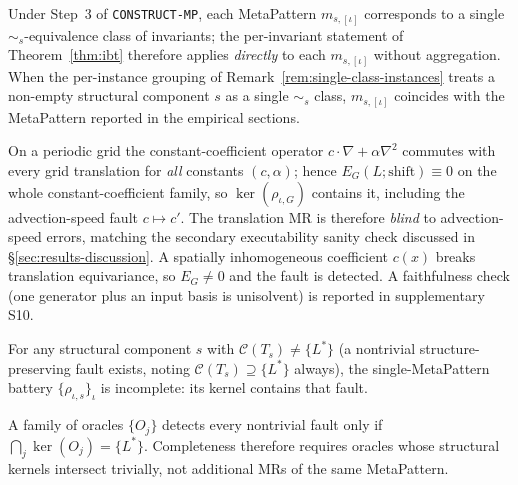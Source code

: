 \begin{remark}
\label{rem:ibt-mp}
Under Step~3 of \texttt{CONSTRUCT-MP}, each MetaPattern $m_{s,[\iota]}$ corresponds
to a single $\sim_s$-equivalence class of invariants; the per-invariant statement
of Theorem~\ref{thm:ibt} therefore applies \emph{directly} to each $m_{s,[\iota]}$
without aggregation. When the per-instance grouping of
Remark~\ref{rem:single-class-instances} treats a non-empty structural component $s$ as a single
$\sim_s$ class, $m_{s,[\iota]}$ coincides with the MetaPattern reported
in the empirical sections.
\end{remark}

\begin{remark}
\label{rem:ibt-advdiff}
On a periodic grid the constant-coefficient operator $c\cdot\nabla+\alpha\nabla^2$
commutes with every grid translation for \emph{all} constants $(c,\alpha)$; hence
$E_G(L;\text{shift})\equiv 0$ on the whole constant-coefficient family, so
$\ker(\rho_{\iota,G})$ contains it, including the advection-speed fault $c\mapsto c'$.
The translation MR is therefore \emph{blind} to advection-speed errors, matching
the secondary executability sanity check discussed in
\S\ref{sec:results-discussion}.
A spatially inhomogeneous coefficient $c(x)$ breaks translation equivariance, so
$E_G\neq 0$ and the fault is detected. A faithfulness check (one generator plus an
input basis is unisolvent) is reported in supplementary S10.
\end{remark}

\begin{corollary*}
For any structural component $s$ with $\mathcal{C}(T_s)\neq\{L^{*}\}$ (a nontrivial structure-
preserving fault exists, noting $\mathcal{C}(T_s)\supseteq\{L^{*}\}$ always), the
single-MetaPattern battery $\{\rho_{\iota,s}\}_\iota$ is
incomplete: its kernel contains that fault.
\end{corollary*}

\begin{corollary*}
A family of oracles $\{O_j\}$ detects every nontrivial fault only if
$\bigcap_j\ker(O_j)=\{L^{*}\}$. Completeness therefore requires oracles whose
structural kernels intersect trivially, not additional MRs of the same MetaPattern.
\end{corollary*}

